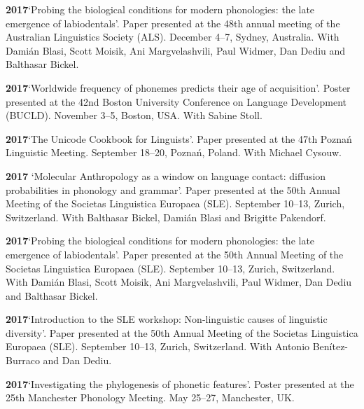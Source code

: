 \documentclass[11pt]{article}
\newcommand{\hangpara}{
 \setlength{\parindent}{0in} %
 \hangindent=0.42in %
}
\begin{document}
\vskip 6pt
\hangpara
{\bf 2017}\hspace{1ex}`Probing the biological conditions for modern phonologies: the late emergence of labiodentals'. Paper presented at the 48th annual meeting of the Australian Linguistics Society (ALS). December 4--7, Sydney, Australia. With Dami{\'a}n Blasi, Scott Moisik, Ani Margvelashvili, Paul Widmer, Dan Dediu and Balthasar Bickel.

\vskip 6pt
\hangpara
{\bf 2017}\hspace{1ex}`Worldwide frequency of phonemes predicts their age of acquisition'. Poster presented at the 42nd Boston University Conference on Language Development (BUCLD). November 3--5, Boston, USA. With Sabine Stoll.

\vskip 6pt
\hangpara
{\bf 2017}\hspace{1ex}`The Unicode Cookbook for Linguists'. Paper presented at the 47th Pozna{\'n} Linguistic Meeting. September 18--20, Pozna{\'n}, Poland. With Michael Cysouw. 

\vskip 6pt
\hangpara
{\bf 2017}\hspace{1ex} `Molecular Anthropology as a window on language contact: diffusion probabilities in phonology and grammar'. Paper presented at the 50th Annual Meeting of the Societas Linguistica Europaea (SLE). September 10--13, Zurich, Switzerland. With Balthasar Bickel, Dami{\'a}n Blasi and Brigitte Pakendorf.
 
\vskip 6pt
\hangpara
{\bf 2017}\hspace{1ex}`Probing the biological conditions for modern phonologies: the late emergence of labiodentals'. Paper presented at the 50th Annual Meeting of the Societas Linguistica Europaea (SLE). September 10--13, Zurich, Switzerland. With Dami{\'a}n Blasi, Scott Moisik, Ani Margvelashvili, Paul Widmer, Dan Dediu and Balthasar Bickel.

\vskip 6pt
\hangpara
{\bf 2017}\hspace{1ex}`Introduction to the SLE workshop: Non-linguistic causes of linguistic diversity'. Paper presented at the 50th Annual Meeting of the Societas Linguistica Europaea (SLE). September 10--13, Zurich, Switzerland. With Antonio Benítez-Burraco and Dan Dediu.

\vskip 6pt
\hangpara
{\bf 2017}\hspace{1ex}`Investigating the phylogenesis of phonetic features'. Poster presented at the 25th Manchester Phonology Meeting. May 25--27, Manchester, UK.
\end{document}
